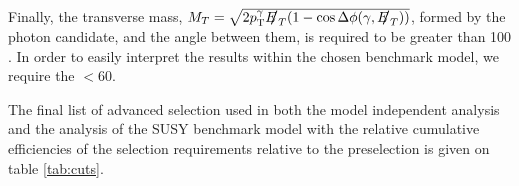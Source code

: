     Finally, the transverse mass, $M_{T} = \sqrt{2 \pt^{\gamma} \met (1-\cos\Delta\phi(\gamma,\met))}$, formed by the photon candidate, \met and the angle between them,  is required to be greater than 100 \GeV. In order to easily interpret the results within the chosen benchmark model, we require the \etg$ < $60\GeV.

	The final list of advanced selection used in both the model independent analysis and the analysis of the SUSY benchmark model with the relative cumulative efficiencies of the selection requirements relative to the preselection is given on table \ref{tab:cuts}. 
	
